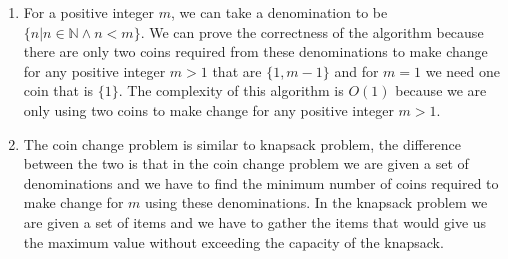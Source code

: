 \documentclass[addpoints,a4paper]{exam}
\begin{document}
\begin{questions}
\begin{solution}
\begin{enumerate}
\begin{lstlisting}[language=cpp]
int main(void) {
	assert(coinChange(0u) == 0u);
	assert(coinChange(1u) == 1u);
	assert(coinChange(2u) == 1u);
	assert(coinChange(3u) == 2u);
	assert(coinChange(4u) == 1u);
	assert(coinChange(5u) == 2u);
	assert(coinChange(6u) == 2u);
	assert(coinChange(7u) == 3u);
	assert(coinChange(8u) == 1u);

	std::cout << "All tests passed!" << std::endl;

	return 0;
}
			\end{lstlisting}
			      \begin{lstlisting}[language=cpp]
$ g++ -std=c++11 -o coinChange coinChange.cpp
$ ./coinChange
				\end{lstlisting}
			      The complexity of this algorithm is \(O(\lg m)\) because we are only using the digits of the number \(m\) in base \(2\) to make change for it. We are not using any other information about the number \(m\).
			      
			\item For a positive integer \(m\), we can take a denomination to be \(\{n|n\in\mathbb{N}\land n<m\}\). We can prove the correctness of the algorithm because there are only two coins required from these denominations to make change for any positive integer \(m>1\) that are \(\{1, m-1\}\) and for \(m=1\) we need one coin that is \(\{1\}\). The complexity of this algorithm is \(O(1)\) because we are only using two coins to make change for any positive integer \(m>1\).
			\item The coin change problem is similar to knapsack problem, the difference between the two is that in the coin change problem we are given a set of denominations and we have to find the minimum number of coins required to make change for \(m\) using these denominations. In the knapsack problem we are given a set of items and we have to gather the items that would give us the maximum value without exceeding the capacity of the knapsack.
		\end{enumerate}
		
		
	\end{solution}
	
\end{questions}
\end{document}
